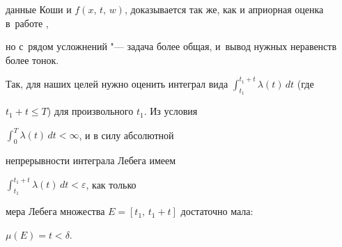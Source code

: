 данные Коши и $f(x,\,t,\,w)$, доказывается так же, как и априорная оценка в~работе \cite{dm:b1},


но с~рядом усложнений "--- задача более общая, и~вывод нужных неравенств более тонок.


Так, для наших целей нужно оценить интеграл вида $\displaystyle\int_{t_1}^{t_1+t}\!\!\!\!\lambda(t)\,dt$ (где


$t_1+t\le T$) для произвольного $t_1$. Из условия


$\displaystyle\int_0^T\!\!\lambda(t)\,dt<\infty$, и в силу абсолютной


непрерывности интеграла Лебега имеем


$\displaystyle \int_{t_1}^{t_1+t}\!\!\!\!\lambda(t)\,dt<\varepsilon$, как только


мера Лебега множества $E=[t_1,\,t_1+t]$ достаточно мала:


$\mu(E)=t<\delta$.











